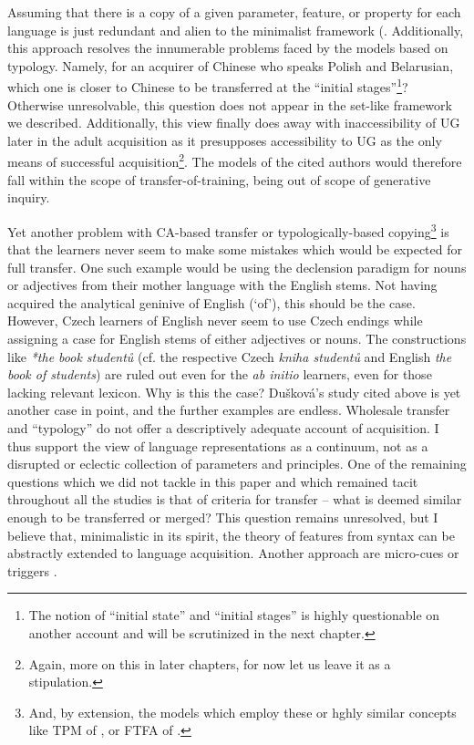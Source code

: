 \documentclass{article}
\begin{document}
Assuming that there is a copy of a given parameter, feature, or property for each language is just redundant and alien to the minimalist framework (\citep[cf.][]{chomsky_phases_2005, berwick_biolinguistic_2011}. Additionally, this approach resolves the innumerable problems faced by the models based on typology. Namely, for an acquirer of Chinese who speaks Polish and Belarusian, which one is closer to Chinese to be transferred at the ``initial stages''\footnote{The notion of ``initial state'' and ``initial stages'' is highly questionable on another account and will be scrutinized in the next chapter.}? Otherwise unresolvable, this question does not appear in the set-like framework we described. Additionally, this view finally does away with inaccessibility of UG later in the adult acquisition  \citep[see][]{lenneberg_biological_1967, clahsen_availability_1986, schachter_what_1989} as it presupposes accessibility to UG as the only means of successful acquisition\footnote{Again, more on this in later chapters, for now let us leave it as a stipulation.}. The models of the cited authors would therefore fall within the scope of transfer-of-training, being out of scope of generative inquiry.  

Yet another problem with CA-based transfer or typologically-based copying\footnote{And, by extension, the models which employ these or hghly similar concepts like TPM of \cite{rothman_linguistic_2015}, or FTFA of \cite{schwartz_l2_1996}.} is that the learners never seem to make some mistakes which would be expected for full transfer. One such example would be using the declension paradigm for nouns or adjectives from their mother language with the English stems. Not having acquired the analytical geninive of English (‘of’), this should be the case. However, Czech learners of English never seem to use Czech endings while assigning a case for English stems of either adjectives or nouns. The constructions like \textit{*the book studentů} (cf. the respective Czech \textit{kniha studentů} and English \textit{the book of students}) are ruled out even for the \textit{ab initio} learners, even for those lacking relevant lexicon. Why is this the case? Dušková’s study cited above is yet another case in point, and the further examples are endless. Wholesale transfer and ``typology'' do not offer a descriptively adequate account of acquisition. I thus support the view of language representations as a continuum, not as a disrupted or eclectic collection of parameters and principles. One of the remaining questions which we did not tackle in this paper and which remained tacit throughout all the studies is that of criteria for transfer -- what is deemed similar enough to be transferred or merged? This question remains unresolved, but I believe that, minimalistic in its spirit, the theory of features from syntax can be abstractly extended to language acquisition. Another approach are micro-cues \citep{westergaard_acquisition_2008, westergaard_linguistic_2014} or triggers \citep[e.g.,][and the work that followed]{gibson_triggers_1994}.
\end{document}
